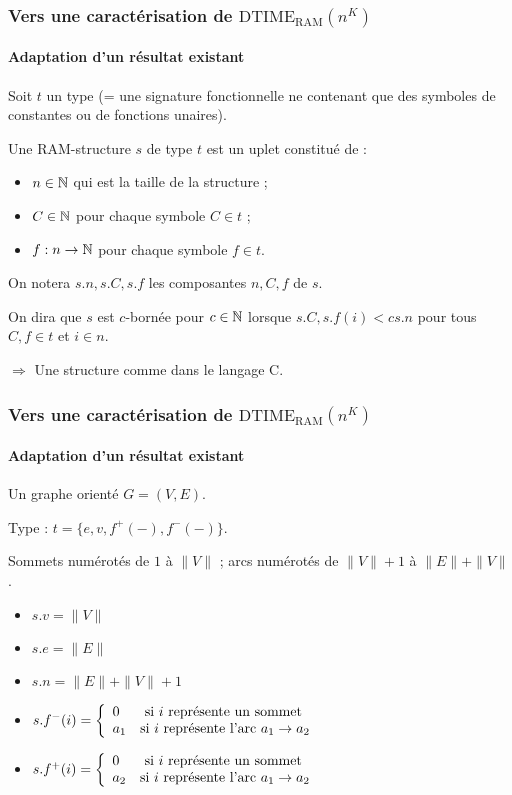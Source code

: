 \documentclass[10pt]{beamer}
\newcommand{\dtimeram}{\text{DTIME}_{\text{RAM}}\left( n^K \right)}
\begin{document}
	\begin{frame}
		\frametitle{Vers une caractérisation de $\dtimeram$}
		\framesubtitle{Adaptation d'un résultat existant}
		
		\begin{defn}
			Soit $t$ un type (= une signature fonctionnelle ne contenant que des symboles de constantes ou de fonctions unaires).
			
			Une RAM-structure $s$ de type $t$ est un uplet constitué de :
			\begin{itemize}[itemsep=-1mm]
				\item 	$n \in \mathbb{N}$ qui est la taille de la structure ;
				\item 	$C \in \mathbb{N}$ pour chaque symbole $C \in t$ ;
				\item 	$f : n \to \mathbb{N}$ pour chaque symbole $f \in t$.
			\end{itemize}
			
			On notera $s.n, s.C, s.f$ les composantes $n, C, f$ de $s$.
			
			On dira que $s$ est $c$-bornée pour $c\in\mathbb{N}$ lorsque $s.C, s.f(i) < c s.n$ pour tous $C, f \in t$ et $i \in n$.
		\end{defn}
		
		$\Rightarrow$ Une structure comme dans le langage C.
		
	\end{frame}
	
	\begin{frame}
		\frametitle{Vers une caractérisation de $\dtimeram$}
		\framesubtitle{Adaptation d'un résultat existant}

		\begin{exemple}
			Un graphe orienté $G = (V,E)$.
			
			Type : $t = \{ e, v, f^+(-), f^-(-) \}$.
			
			Sommets numérotés de $1$ à $\| V\|$ ; arcs numérotés de $\| V\| +1 $ à $\| E \| + \| V \|$.
			
			\begin{itemize}
				\item 	$s.v = \| V \|$
				\item 	$s.e = \| E \|$
				\item 	$s.n = \| E \| + \| V \| + 1$
				\item 	$s.f^-(i) = \left\lbrace \begin{array}{ll} 
										0 & \text{ si $i$ représente un sommet} \\
										a_1 & \text{si $i$ représente l'arc $a_1 \to a_2$}
										 \end{array} \right.$
				\item 	$s.f^+(i) = \left\lbrace \begin{array}{ll} 
										0 & \text{ si $i$ représente un sommet} \\
										a_2 & \text{si $i$ représente l'arc $a_1 \to a_2$}
									 \end{array} \right.$
			\end{itemize}
		\end{exemple}
	\end{frame}
		
\end{document}
